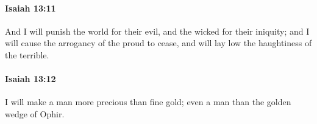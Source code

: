 		\paragraph{Isaiah 13:11} %
			\label{ISAIAH-13-11}

			And I will punish the world for their evil, and the wicked for their iniquity; and I will cause the arrogancy of the proud to cease, and will lay low the haughtiness of the terrible.


		\paragraph{Isaiah 13:12} %
			\label{ISAIAH-13-12}

			I will make a man more precious than fine gold; even a man than the golden wedge of Ophir.


